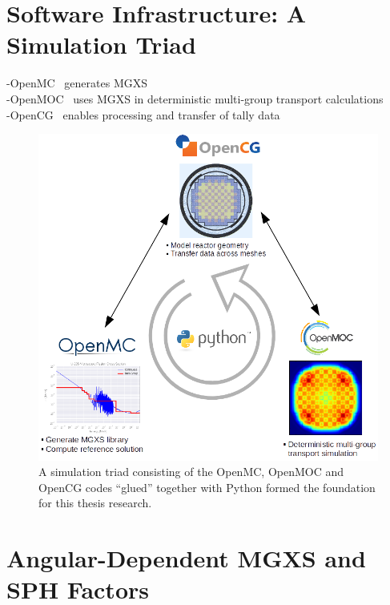 \documentclass[12pt,twoside]{mitthesis-exec}
\begin{document}
\section*{Software Infrastructure: A Simulation Triad}

-OpenMC~\cite{romano2013openmc} generates MGXS \\
-OpenMOC~\cite{boyd2014openmoc} uses MGXS in deterministic multi-group transport calculations \\
-OpenCG~\cite{boyd2015opencg} enables processing and transfer of tally data  \\

\begin{figure}[h!]
  \centering
  \includegraphics[width=\linewidth]{figures/workflow/triad/simulation-triad}
\caption[A simulation triad of OpenMC, OpenMOC and OpenCG]{A simulation triad consisting of the OpenMC, OpenMOC and OpenCG codes ``glued'' together with Python formed the foundation for this thesis research.}
\label{fig:simulation-triad}
\end{figure}

\clearpage

\section*{Angular-Dependent MGXS and SPH Factors}
\end{document}

